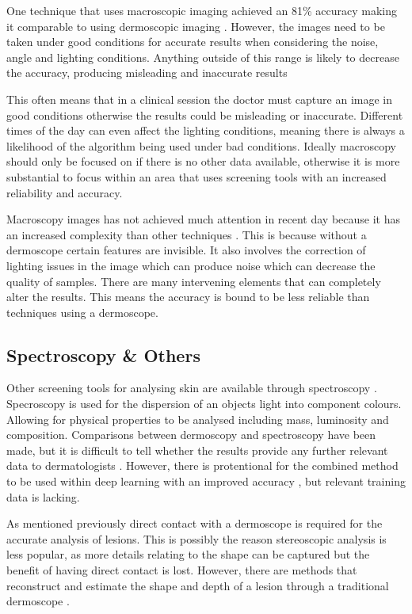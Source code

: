 \documentclass[12pt]{report}
\begin{document}
One technique that uses macroscopic imaging achieved an 81\% accuracy making it comparable to using dermoscopic imaging \cite{Giotis2015}. However, the images need to be taken under good conditions for accurate results when considering the noise, angle and lighting conditions. Anything outside of this range is likely to decrease the accuracy, producing misleading and inaccurate results

This often means that in a clinical session the doctor must capture an image in good conditions otherwise the results could be misleading or inaccurate. Different times of the day can even affect the lighting conditions, meaning there is always a likelihood of the algorithm being used under bad conditions. Ideally macroscopy should only be focused on if there is no other data available, otherwise it is more substantial to focus within an area that uses screening tools with an increased reliability and accuracy.

Macroscopy images has not achieved much attention in recent day because it has an increased complexity than other techniques \cite{Amelard2014}. This is because without a dermoscope certain features are invisible. It also involves the correction of lighting issues in the image which can produce noise which can decrease the quality of samples. There are many intervening elements that can completely alter the results. This means the accuracy is bound to be less reliable than techniques using a dermoscope.

\subsection{Spectroscopy \& Others}
Other screening tools for analysing skin are available through spectroscopy \cite{Carpenter2018}. Specroscopy is used for the dispersion of an objects light into component colours. Allowing for physical properties to be analysed including mass, luminosity and composition. Comparisons between dermoscopy and spectroscopy have been made, but it is difficult to tell whether the results provide any further relevant data to dermatologists \cite{FerrantediRuffano2018}. However, there is protentional for the combined method to be used within deep learning with an improved accuracy \cite{Gessert2019}, but relevant training data is lacking. 

As mentioned previously direct contact with a dermoscope is required for the accurate analysis of lesions. This is possibly the reason stereoscopic analysis is less popular, as more details relating to the shape can be captured but the benefit of having direct contact is lost. However, there are methods that reconstruct and estimate the shape and depth of a lesion through a traditional dermoscope \cite{Satheesha2017}.
\end{document}
